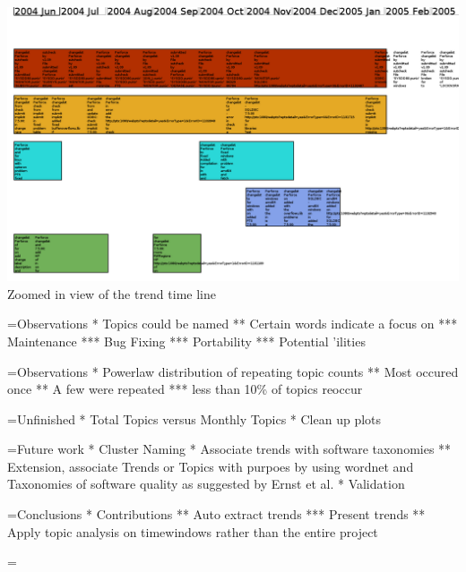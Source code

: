 \documentclass[titlepage,usenames,a4,landscape,semhelv]{seminar}
\begin{document}
\begin{slide}







\newslide


\newslide

\begin{specquoteh}
\begin{center}
\includegraphics[width=1.25\textwidth]{class-smear-plot-crop-scaled-zoomed} \\
Zoomed in view of the trend time line
\end{center}
\end{specquoteh}




=Observations
* Topics could be named
** Certain words indicate a focus on
*** Maintenance
*** Bug Fixing
*** Portability
*** Potential 'ilities

=Observations
* Powerlaw distribution of repeating topic counts
** Most occured once
** A few were repeated 
*** less than 10\% of topics reoccur

=Unfinished
* Total Topics versus Monthly Topics
* Clean up plots

=Future work
* Cluster Naming
* Associate trends with software taxonomies
** Extension, associate Trends or Topics with purpoes by using wordnet and Taxonomies of software quality as suggested by Ernst et al.
* Validation

=Conclusions
* Contributions
** Auto extract trends
*** Present trends
** Apply topic analysis on timewindows rather than the entire project




=
\end{slide}
\end{document}
